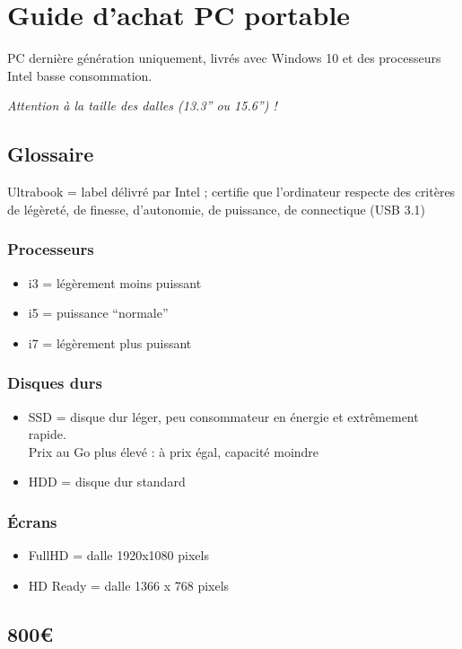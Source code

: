 \documentclass{ki}
\begin{document}
\section{Guide d'achat PC portable}

PC dernière génération uniquement, livrés avec Windows 10 et des processeurs Intel basse consommation.

\emph{Attention à la taille des dalles (13.3” ou 15.6”) !}

\subsection{Glossaire}
Ultrabook = label délivré par Intel ; certifie que l’ordinateur respecte des critères de légèreté, de finesse, d’autonomie, de puissance, de connectique (USB 3.1)

\subsubsection{Processeurs}
\begin{itemize}
    \item i3 = légèrement moins puissant
    \item i5 = puissance “normale”
    \item i7 = légèrement plus puissant
\end{itemize}

\subsubsection{Disques durs}
\begin{itemize}
    \item SSD = disque dur léger, peu consommateur en énergie et extrêmement rapide. \\ Prix au Go plus élevé : à prix égal, capacité moindre
    \item HDD = disque dur standard
\end{itemize}

\subsubsection{Écrans}
\begin{itemize}
    \item FullHD = dalle 1920x1080 pixels
    \item HD Ready = dalle 1366 x 768 pixels
\end{itemize}

\subsection{800€}
\end{document}
